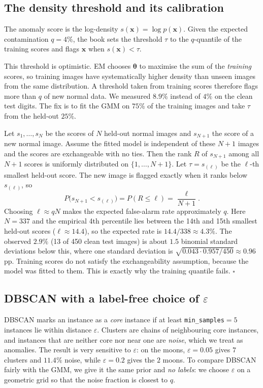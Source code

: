 \documentclass[11pt,a4paper]{article}
\newcommand{\x}{\mathbf{x}}
\newcommand{\vtheta}{\boldsymbol{\theta}}
\begin{document}
\subsection{The density threshold and its calibration}
The anomaly score is the log-density $s(\x)=\log p(\x)$. Given the expected contamination $q=4\%$, the book sets
the threshold $\tau$ to the $q$-quantile of the training scores and flags $\x$ when $s(\x)<\tau$.

This threshold is optimistic. EM chooses $\vtheta$ to maximise the sum of the \emph{training} scores, so training
images have systematically higher density than unseen images from the same distribution. A threshold taken from
training scores therefore flags more than $q$ of new normal data. We measured $8.9\%$ instead of $4\%$ on the clean
test digits. The fix is to fit the GMM on $75\%$ of the training images and take $\tau$ from the held-out $25\%$.

\begin{proofbox}
Let $s_1,\dots,s_N$ be the scores of $N$ held-out normal images and $s_{N+1}$ the score of a new normal image.
Assume the fitted model is independent of these $N+1$ images and the scores are exchangeable with no ties. Then the
rank $R$ of $s_{N+1}$ among all $N+1$ scores is uniformly distributed on $\{1,\dots,N+1\}$. Let $\tau=s_{(\ell)}$
be the $\ell$-th smallest held-out score. The new image is flagged exactly when it ranks below $s_{(\ell)}$, so
\begin{equation*}
  P\bigl(s_{N+1}<s_{(\ell)}\bigr)=P(R\le\ell)=\frac{\ell}{N+1}.
\end{equation*}
Choosing $\ell\approx qN$ makes the expected false-alarm rate approximately $q$. Here $N=337$ and the empirical
4th percentile lies between the 14th and 15th smallest held-out scores ($\ell\approx14.4$), so the expected rate is
$14.4/338\approx4.3\%$. The observed $2.9\%$ (13 of 450 clean test images) is about $1.5$ binomial standard
deviations below this, where one standard deviation is $\sqrt{0.043\cdot0.957/450}\approx0.96$\,pp. Training scores do not satisfy the exchangeability assumption, because the
model was fitted to them. This is exactly why the training quantile fails. \hfill$\square$
\end{proofbox}

\subsection{DBSCAN with a label-free choice of $\varepsilon$}
DBSCAN marks an instance as a \emph{core} instance if at least \texttt{min\_samples}$=5$ instances lie within
distance $\varepsilon$. Clusters are chains of neighbouring core instances, and instances that are neither core
nor near one are \emph{noise}, which we treat as anomalies. The result is very sensitive to $\varepsilon$: on the
moons, $\varepsilon=0.05$ gives $7$ clusters and $11.4\%$ noise, while $\varepsilon=0.2$ gives the $2$ moons. To
compare DBSCAN fairly with the GMM, we give it the same prior and \emph{no labels}: we choose $\varepsilon$ on a
geometric grid so that the noise fraction is closest to $q$.
\end{document}
